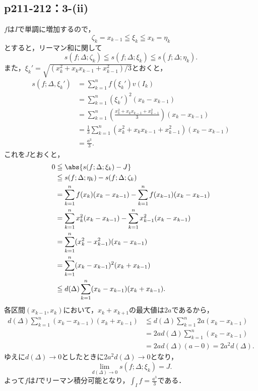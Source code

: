 \documentclass[a4paper,10pt,fleqn]{ltjsarticle}
\begin{document}
        \subsection*{p211-212：3-(ii)}
        \begin{tleftbar}
            $f$は$I$で単調に増加するので，
            \[
            \zeta_k = x_{k-1} \leqq \xi_k \leqq x_k=\eta_k 
            \]
            とすると，リーマン和に関して
            \[
            s(f;\Delta ; \zeta_k ) \leqq s(f;\Delta;\xi_k) \leqq s(f;\Delta;\eta_k).
            \]
            また，$\xi_k' = \sqrt{(x_k ^2 + x_k x_{k-1}+x_{k-1} ^2)/3} $とおくと，
            \begin{align*}
                s(f;\Delta,\xi_k' ) &= \sum_{k=1}^{n} f(\xi_k') v(I_k) \\
                &= \sum_{k=1}^{n} (\xi_k')^2 (x_k - x_{k-1}) \\
                &= \sum_{k=1}^{n} \left( \frac{x_k^2 + x_k x_{k-1} + x_{k-1}^2}{3} \right) (x_k - x_{k-1}) \\
                &= \frac{1}{3} \sum_{k=1}^{n} (x_k^2 + x_k x_{k-1} + x_{k-1}^2) (x_k - x_{k-1}) \\
                & = \frac{a^3}{3}.
            \end{align*}
            これを$J$とおくと，
            \begin{align*}
                0 &\leqq \abs{ s(f;\Delta; \xi_k) - J } \\
                &\leqq s(f;\Delta;\eta_k) - s(f;\Delta ; \zeta_k ) \\
                &= \sum_{k=1}^{n} f(x_k) (x_k - x_{k-1}) - \sum_{k=1}^{n} f(x_{k-1}) (x_k - x_{k-1}) \\
                &= \sum_{k=1}^{n} x_k^2 (x_k - x_{k-1}) - \sum_{k=1}^{n} x_{k-1}^2 (x_k - x_{k-1}) \\
                &= \sum_{k=1}^{n} (x_k^2 - x_{k-1}^2) (x_k - x_{k-1}) \\
                &= \sum_{k=1}^{n} (x_k - x_{k-1})^2 (x_k + x_{k-1}) \\
                &\leqq d(\Delta) \sum_{k=1}^{n} (x_k - x_{k-1}) (x_k + x_{k-1}).
            \end{align*}
            各区間$(x_{k-1},x_k)$において，$x_k + x_{k+1}$の最大値は$2a$であるから，
            \begin{align*}
                d(\Delta) \sum_{k=1}^{n} (x_k - x_{k-1}) (x_k + x_{k-1}) &\leqq d(\Delta) \sum_{k=1}^{n} 2a (x_k - x_{k-1}) \\
                &= 2a d(\Delta) \sum_{k=1}^{n} (x_k - x_{k-1}) \\
                &= 2a d(\Delta) (a - 0) = 2a^2 d(\Delta).
                \end{align*}
            ゆえに$d (\Delta) \to 0$としたときに$2a^2 d(\Delta) \to 0$となり，
            \[
            \lim_{d(\Delta) \to 0} s(f;\Delta; \xi_k)=J.
            \]
            よって$f$は$I$でリーマン積分可能となり，$\int_{I} f = \frac{a^3}{3}$である．
            \end{tleftbar}
\end{document}
